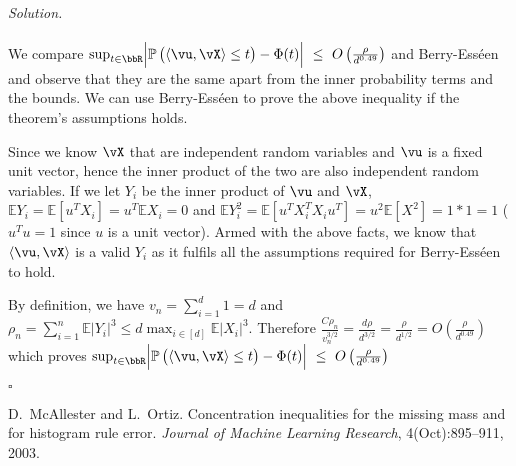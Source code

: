 \documentclass[11pt]{article}
\newcommand\ip[1]{\langle #1 \rangle} %
\newcommand{\E}{\ensuremath{\mathbb{E}}} %
\renewcommand{\P}{\ensuremath{\mathbb{P}}} %
\theoremstyle{definition}
\newenvironment{solution}{\noindent\emph{Solution.}}{\hfill$\square$}
\begin{document}
\begin{solution}
\\ \\
We compare $ \sup_{t \in \bbR} \abs{ \P\del{ \ip{\vu,\vX} \leq t } - \Phi(t) }\ \leq \ O\del{ \frac{\rho}{d^{0.49}} }$ and Berry-Ess\'een and observe that they are the same apart from the inner probability terms and the bounds.  We can use Berry-Ess\'een to prove the above inequality if the theorem's assumptions holds. 

Since we know $\vX$ that are independent random variables and $\vu$ is a fixed unit vector, hence the inner product of the two are also independent random variables. If we let $Y_i$ be the inner product of $\vu$ and $\vX$, $\E Y_i = \E[u^T X_i] = u^T \E X_i = 0$ and $\E Y_i^2 = \E[u^T X_i^T X_i u^T] = u^2 \E[X^2] = 1 * 1 = 1$ ($u^T u = 1$ since $u$ is a unit vector). Armed with the above facts, we know that $\langle  \vu, \vX \rangle$ is a valid $Y_i$ as it fulfils all the assumptions required for Berry-Ess\'een to hold.

By definition, we have $v_n = \sum_{i=1}^{d} 1 = d$ and $\rho_n =  \sum_{i=1}^n \E|Y_i|^3 \leq d \max_{i\in[d]} \E |X_i|^3$. Therefore $\frac{C\rho_n}{v_n^{3/2}} = \frac{d \rho}{d^{3/2}} = \frac{\rho}{d^{1/2}} = O(\frac{\rho}{d^{0.49}})$ which proves $ \sup_{t \in \bbR} \abs{ \P\del{ \ip{\vu,\vX} \leq t } - \Phi(t) }\ \leq \ O\del{ \frac{\rho}{d^{0.49}} }$



\end{solution}

\newpage


\begin{thebibliography}{1}
  D.~McAllester and L.~Ortiz.
  \newblock Concentration inequalities for the missing mass and for histogram rule error.
  \newblock \emph{Journal of Machine Learning Research}, 4(Oct):895--911, 2003.
\end{thebibliography}
\end{document}
